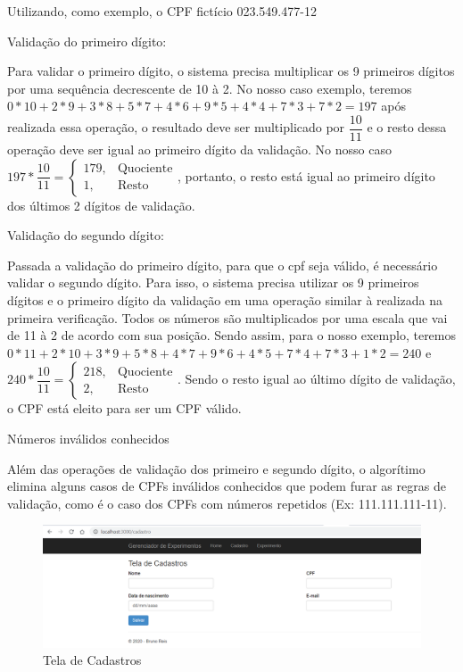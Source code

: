 Utilizando, como exemplo, o CPF fictício 023.549.477-12

Validação do primeiro dígito:

Para validar o primeiro dígito, o sistema precisa multiplicar os 9 primeiros dígitos por uma sequência decrescente de 10 à 2. No nosso caso exemplo, teremos $0*10+2*9+3*8+5*7+4*6+9*5+4*4+7*3+7*2 = 197$ após realizada essa operação, o resultado deve ser multiplicado por $\dfrac{10}{11}$ e o resto dessa operação deve ser igual ao primeiro dígito da validação. No nosso caso $197*\dfrac{10}{11} =  \left \{ \begin{matrix} 179, & \mbox{Quociente} \\ 1, & \mbox{Resto}\end{matrix} \right.	$, portanto, o resto está igual ao primeiro dígito dos últimos 2 dígitos de validação.

Validação do segundo dígito:

Passada a validação do primeiro dígito, para que o cpf seja válido, é necessário validar o segundo dígito. Para isso, o sistema precisa utilizar os 9 primeiros dígitos e o primeiro dígito da validação em uma operação similar à realizada na primeira verificação. Todos os números são multiplicados por uma escala que vai de 11 à 2 de acordo com sua posição. Sendo assim, para o nosso exemplo, teremos $0*11+2*10+3*9+5*8+4*7+9*6+4*5+7*4+7*3+1*2 = 240$ e $240*\dfrac{10}{11} =  \left \{ \begin{matrix} 218, & \mbox{Quociente} \\ 2, & \mbox{Resto}\end{matrix} \right.	$. Sendo o resto igual ao último dígito de validação, o CPF está eleito para ser um CPF válido.

Números inválidos conhecidos

Além das operações de validação dos primeiro e segundo dígito, o algorítimo elimina alguns casos de CPFs inválidos conhecidos que podem furar as regras de validação, como é o caso dos CPFs com números repetidos (Ex: 111.111.111-11).


\begin{figure}[h!]
	\begin{center}
		\includegraphics[width=0.8\linewidth]{images/tela_cadastros.png}
		\caption{Tela de Cadastros}
		\label{fig:tela_cadastros}
	\end{center}
\end{figure}

